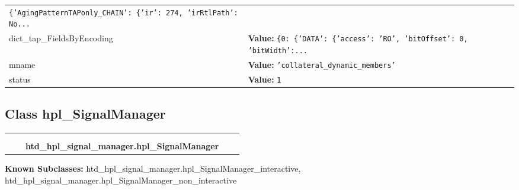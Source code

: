 \begin{longtable}{|p{\varnamewidth}|p{\vardescrwidth}|l}
{\tt \texttt{\{}\texttt{'}\texttt{AgingPatternTAPonly\_CHAIN}\texttt{'}\texttt{: }\texttt{\{}\texttt{'}\texttt{ir}\texttt{'}\texttt{: }274\texttt{, }\texttt{'}\texttt{irRtlPath}\texttt{'}\texttt{: }No\texttt{...}}&\\
\cline{1-2}
\raggedright d\-i\-c\-t\-\_\-t\-a\-p\-\_\-F\-i\-e\-l\-d\-s\-B\-y\-E\-n\-c\-o\-d\-i\-n\-g\- & \raggedright \textbf{Value:} 
{\tt \texttt{\{}0\texttt{: }\texttt{\{}\texttt{'}\texttt{DATA}\texttt{'}\texttt{: }\texttt{\{}\texttt{'}\texttt{access}\texttt{'}\texttt{: }\texttt{'}\texttt{RO}\texttt{'}\texttt{, }\texttt{'}\texttt{bitOffset}\texttt{'}\texttt{: }0\texttt{, }\texttt{'}\texttt{bitWidth}\texttt{'}\texttt{:}\texttt{...}}&\\
\cline{1-2}
\raggedright m\-n\-a\-m\-e\- & \raggedright \textbf{Value:} 
{\tt \texttt{'}\texttt{collateral\_dynamic\_members}\texttt{'}}&\\
\cline{1-2}
\raggedright s\-t\-a\-t\-u\-s\- & \raggedright \textbf{Value:} 
{\tt 1}&\\
\cline{1-2}
\end{longtable}



\subsection{Class hpl\_SignalManager}

    \label{htd_hpl_signal_manager:hpl_SignalManager}
\begin{tabular}{cccccc}
\multicolumn{2}{r}{\settowidth{\BCL}{object}\multirow{2}{\BCL}{object}}
&&
  \\\cline{3-3}
  &&\multicolumn{1}{c|}{}
&&
  \\
&&\multicolumn{2}{l}{\textbf{htd\_hpl\_signal\_manager.hpl\_SignalManager}}
\end{tabular}

\textbf{Known Subclasses:}
htd\_hpl\_signal\_manager.hpl\_SignalManager\_interactive,
    htd\_hpl\_signal\_manager.hpl\_SignalManager\_non\_interactive



